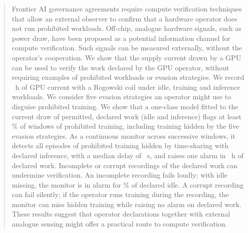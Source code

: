 \documentclass{article}
\begin{document}

\printAffiliationsAndNotice{}

\begin{abstract}
Frontier AI governance agreements require compute verification techniques that allow an external observer to confirm that a hardware operator does not run prohibited workloads. Off-chip, analogue hardware signals, such as power draw, have been proposed as a potential information channel for compute verification. Such signals can be measured externally, without the operator's cooperation. We show that the supply current drawn by a GPU can be used to verify the work declared by the GPU operator, without requiring examples of prohibited workloads or evasion strategies. We record \CorpusHours{}~h of GPU current with a Rogowski coil under idle, training and inference workloads. We consider five evasion strategies an operator might use to disguise prohibited training. We show that a one-class model fitted to the current draw of permitted, declared work (idle and inference) flags at least \RoneMinGroup\% of windows of prohibited training, including training hidden by the five evasion strategies. As a continuous monitor across successive windows, it detects all \EpScored{} episodes of prohibited training hidden by time-sharing with declared inference, with a median delay of \EpDelayRone{}~s, and raises one alarm in \ExpDeclH{}~h of declared work. Incomplete or corrupt recordings of the declared work can undermine verification. An incomplete recording fails loudly; with idle missing, the monitor is in alarm for \TfourIdleADecode\% of declared idle. A corrupt recording can fail silently; if the operator runs training during the recording, the monitor can miss hidden training while raising no alarm on declared work. These results suggest that operator declarations together with external analogue sensing might offer a practical route to compute verification. 
\end{abstract}
\end{document}

